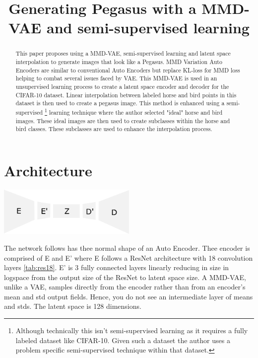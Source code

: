 \documentclass{article}
\title{Generating Pegasus with a MMD-VAE and semi-supervised learning}
\begin{document}
\maketitle
\begin{abstract}
    This paper proposes using a MMD-VAE, semi-supervised learning and latent space interpolation to generate images that look like a Pegasus. MMD Variation Auto Encoders are similar to conventional Auto Encoders but replace KL-loss for MMD loss helping to combat several issues faced by VAE. This MMD-VAE is used in an unsupervised learning process to create a latent space encoder and decoder for the CIFAR-10 dataset. Linear interpolation between labeled horse and bird points in this dataset is then used to create a pegasus image. This method is enhanced using a semi-supervised \footnote{Although technically this isn't semi-supervised learning as it requires a fully labeled dataset like CIFAR-10. Given such a dataset the author uses a problem specific semi-supervised technique within that dataset.} learning technique where the author selected "ideal" horse and bird images. These ideal images are then used to create subclasses within the horse and bird classes. These subclasses are used to enhance the interpolation process.

\end{abstract}

\section{Architecture}
\begin{center}
    \includegraphics[width=0.5\textwidth]{figures/Encoder.png}
\end{center}
The network follows has thee normal shape of an Auto Encoder.
Thee encoder is comprised of E and E' where E follows a ResNet \cite{ResNet} architecture with 18 convolution layers \ref{tab:res18}. E' is 3 fully connected layers linearly reducing in size in logspace from the output size of the ResNet to latent space size. A MMD-VAE, unlike a VAE, samples directly from the encoder rather than from an encoder's mean and std output fields. Hence, you do not see an intermediate layer of means and stds. The latent space is 128 dimensions. 
\end{document}
